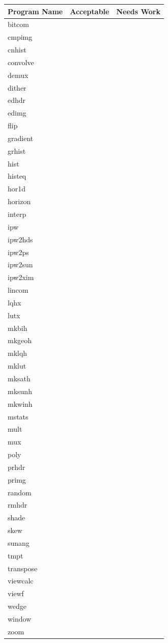\begin{tabular}{||l|l|l||} \hline
Program Name & Acceptable & Needs Work \\ \hline\hline
bitcom & & \\ \hline
cmpimg & & \\ \hline
cnhist & & \\ \hline
convolve & & \\ \hline
demux & & \\ \hline
dither & & \\ \hline
edhdr & & \\ \hline
edimg & & \\ \hline
flip & & \\ \hline
gradient & & \\ \hline
grhist & & \\ \hline
hist & & \\ \hline
histeq & & \\ \hline
hor1d & & \\ \hline
horizon & & \\ \hline
interp & & \\ \hline
ipw & & \\ \hline
ipw2hds & & \\ \hline
ipw2ps & & \\ \hline
ipw2sun & & \\ \hline
ipw2xim & & \\ \hline
lincom & & \\ \hline
lqhx & & \\ \hline
lutx & & \\ \hline
mkbih & & \\ \hline
mkgeoh & & \\ \hline
mklqh & & \\ \hline
mklut & & \\ \hline
mksath & & \\ \hline
mksunh & & \\ \hline
mkwinh & & \\ \hline
mstats & & \\ \hline
mult & & \\ \hline
mux & & \\ \hline
poly & & \\ \hline
prhdr & & \\ \hline
primg & & \\ \hline
random & & \\ \hline
rmhdr & & \\ \hline
shade & & \\ \hline
skew & & \\ \hline
sunang & & \\ \hline
tmpt & & \\ \hline
transpose & & \\ \hline
viewcalc & & \\ \hline
viewf & & \\ \hline
wedge & & \\ \hline
window & & \\ \hline
zoom & & \\ \hline
\end{tabular}

